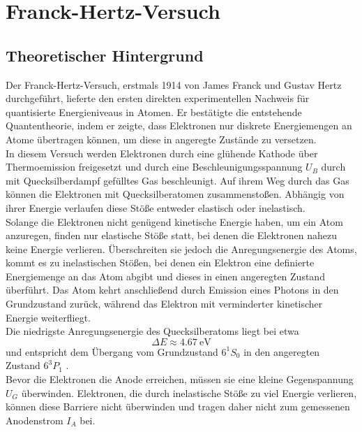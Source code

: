 \chapter{Franck-Hertz-Versuch}


\section{Theoretischer Hintergrund}
Der Franck-Hertz-Versuch, erstmals 1914 von James Franck und Gustav Hertz durchgeführt, lieferte den ersten direkten experimentellen Nachweis für quantisierte Energieniveaus in Atomen. Er bestätigte die entstehende Quantentheorie, indem er zeigte, dass Elektronen nur diskrete Energiemengen an Atome übertragen können, um diese in angeregte Zustände zu versetzen.
\vspace{0.3cm}\\
In diesem Versuch werden Elektronen durch eine glühende Kathode über Thermoemission freigesetzt und durch eine Beschleunigungsspannung $U_B$ durch mit Quecksilberdampf gefülltes Gas beschleunigt. Auf ihrem Weg durch das Gas können die Elektronen mit Quecksilberatomen zusammenstoßen. Abhängig von ihrer Energie verlaufen diese Stöße entweder elastisch oder inelastisch.
\vspace{0.3cm}\\
Solange die Elektronen nicht genügend kinetische Energie haben, um ein Atom anzuregen, finden nur elastische Stöße statt, bei denen die Elektronen nahezu keine Energie verlieren. Überschreiten sie jedoch die Anregungsenergie des Atoms, kommt es zu inelastischen Stößen, bei denen ein Elektron eine definierte Energiemenge an das Atom abgibt und dieses in einen angeregten Zustand überführt. Das Atom kehrt anschließend durch Emission eines Photons in den Grundzustand zurück, während das Elektron mit verminderter kinetischer Energie weiterfliegt.
\vspace{0.3cm}\\
Die niedrigste Anregungsenergie des Quecksilberatoms liegt bei etwa
\begin{equation}
\Delta E \approx \SI{4.67}{\electronvolt} 
\end{equation}
und entspricht dem Übergang vom Grundzustand $6^1S_0$ in den angeregten Zustand $6^3P_1$ \cite{Hg_excitationEnergy}.
\vspace{0.3cm}\\
Bevor die Elektronen die Anode erreichen, müssen sie eine kleine Gegenspannung $U_G$ überwinden. Elektronen, die durch inelastische Stöße zu viel Energie verlieren, können diese Barriere nicht überwinden und tragen daher nicht zum gemessenen Anodenstrom $I_A$ bei.
